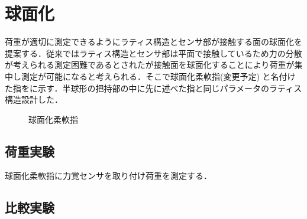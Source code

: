 \section{球面化}
荷重が適切に測定できるようにラティス構造とセンサ部が接触する面の球面化を提案する．従来ではラティス構造とセンサ部は平面で接触しているため力の分散が考えられる測定困難であるとされたが接触面を球面化することにより荷重が集中し測定が可能になると考えられる．そこで球面化柔軟指(変更予定)	と名付けた指をに示す．半球形の把持部の中に先に述べた指と同じパラメータのラティス構造設計した．


\begin{figure}[h]
\centering
{}
\hspace{5mm}
\caption{球面化柔軟指}
\label{fig::semi_finger}
\end{figure}

\subsection{荷重実験}
球面化柔軟指に力覚センサを取り付け荷重を測定する．

\subsection{比較実験}



